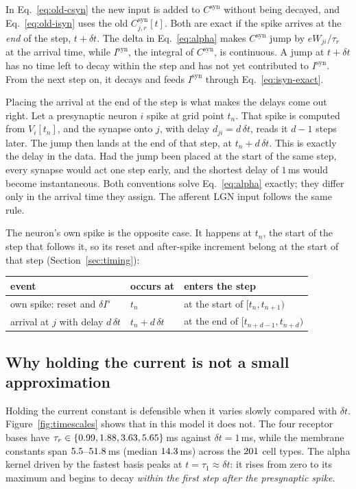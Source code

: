 \documentclass[11pt,a4paper,numbers=noenddot]{scrartcl}
\newcommand{\dt}{\delta t}
\newcommand{\Isyn}{I^{\mathrm{syn}}}
\newcommand{\Csyn}{C^{\mathrm{syn}}}
\begin{document}
In Eq.~\eqref{eq:old-csyn} the new input is added to $\Csyn$ without being
decayed, and Eq.~\eqref{eq:old-isyn} uses the old $\Csyn_{j,r}[t]$. Both
are exact if the spike arrives at the \emph{end} of the step, $t+\dt$. The
delta in Eq.~\eqref{eq:alpha} makes $\Csyn$ jump by $eW_{ji}/\tau_r$ at the
arrival time, while $\Isyn$, the integral of $\Csyn$, is continuous. A jump at
$t+\dt$ has no time left to decay within the step and has not yet
contributed to $\Isyn$. From the next step on, it decays and feeds $\Isyn$
through Eq.~\eqref{eq:isyn-exact}.

Placing the arrival at the end of the step is what makes the delays come out
right. Let a presynaptic neuron $i$ spike at grid point $t_n$. That spike is
computed from $V_i[t_n]$, and the synapse onto $j$, with delay
$d_{ji} = d\,\dt$, reads it $d-1$ steps later. The jump then lands at the end
of that step, at $t_n + d\,\dt$. This is exactly the delay in the data. Had
the jump been placed at the start of the same step, every synapse would act
one step early, and the shortest delay of $1\,$ms would become
instantaneous. Both conventions solve Eq.~\eqref{eq:alpha} exactly; they
differ only in the arrival time they assign. The afferent LGN input follows
the same rule.

The neuron's own spike is the opposite case. It happens at $t_n$, the start
of the step that follows it, so its reset and after-spike increment belong
at the start of that step (Section~\ref{sec:timing}):
%
\begin{center}
\begin{tabular}{lll}
\toprule
event & occurs at & enters the step \\
\midrule
own spike: reset and $\delta I^{s}$ & $t_n$ & at the start of $[t_n, t_{n+1})$ \\
arrival at $j$ with delay $d\,\dt$ & $t_n + d\,\dt$ & at the end of $[t_{n+d-1}, t_{n+d})$ \\
\bottomrule
\end{tabular}
\end{center}

\subsection{Why holding the current is not a small approximation}

Holding the current constant is defensible when it varies slowly
compared with $\dt$. Figure~\ref{fig:timescales} shows that in this model it
does not. The four receptor bases have
$\tau_r \in \{0.99, 1.88, 3.63, 5.65\}\,$ms against
$\dt = 1\,$ms, while the membrane constants span
$5.5$--$51.8\,$ms (median $14.3\,$ms) across the
$201$ cell types. The alpha kernel driven by the fastest basis peaks
at $t = \tau_1 \approx \dt$: it rises from zero to its maximum and begins to
decay \emph{within the first step after the presynaptic spike}.
\end{document}
